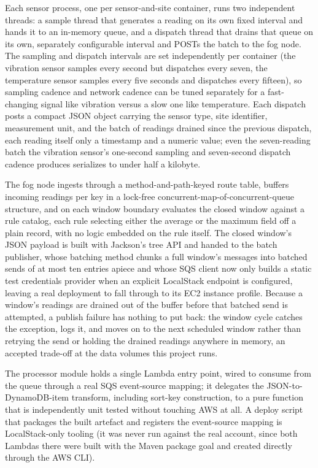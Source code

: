 \documentclass[conference]{IEEEtran}
\begin{document}
Each sensor process, one per sensor-and-site container, runs two independent threads: a sample thread that generates a reading on its own fixed interval and hands it to an in-memory queue, and a dispatch thread that drains that queue on its own, separately configurable interval and POSTs the batch to the fog node. The sampling and dispatch intervals are set independently per container (the vibration sensor samples every second but dispatches every seven, the temperature sensor samples every five seconds and dispatches every fifteen), so sampling cadence and network cadence can be tuned separately for a fast-changing signal like vibration versus a slow one like temperature. Each dispatch posts a compact JSON object carrying the sensor type, site identifier, measurement unit, and the batch of readings drained since the previous dispatch, each reading itself only a timestamp and a numeric value; even the seven-reading batch the vibration sensor's one-second sampling and seven-second dispatch cadence produces serializes to under half a kilobyte.

The fog node ingests through a method-and-path-keyed route table, buffers incoming readings per key in a lock-free concurrent-map-of-concurrent-queue structure, and on each window boundary evaluates the closed window against a rule catalog, each rule selecting either the average or the maximum field off a plain record, with no logic embedded on the rule itself. The closed window's JSON payload is built with Jackson's tree API and handed to the batch publisher, whose batching method chunks a full window's messages into batched sends of at most ten entries apiece and whose SQS client now only builds a static test credentials provider when an explicit LocalStack endpoint is configured, leaving a real deployment to fall through to its EC2 instance profile. Because a window's readings are drained out of the buffer before that batched send is attempted, a publish failure has nothing to put back: the window cycle catches the exception, logs it, and moves on to the next scheduled window rather than retrying the send or holding the drained readings anywhere in memory, an accepted trade-off at the data volumes this project runs.

The processor module holds a single Lambda entry point, wired to consume from the queue through a real SQS event-source mapping; it delegates the JSON-to-DynamoDB-item transform, including sort-key construction, to a pure function that is independently unit tested without touching AWS at all. A deploy script that packages the built artefact and registers the event-source mapping is LocalStack-only tooling (it was never run against the real account, since both Lambdas there were built with the Maven package goal and created directly through the AWS CLI).
\end{document}
